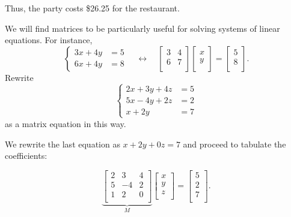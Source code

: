 \documentclass[../gatm_answers.tex]{subfiles}
\begin{document}
Thus, the party costs \$26.25 for the restaurant.

\begin{outer_problem}
\item We will find matrices to be particularly useful for solving systems of linear equations. For instance, $$\begin{cases}3x+4y&=5 \\ 6x+4y &= 8\end{cases}\quad\longleftrightarrow\quad\left[\begin{array}{cc} 3 & 4 \\ 6 & 7 \\ \end{array}\right]\left[\begin{array}{c} x \\ y \\ \end{array}\right]=\left[\begin{array}{c} 5 \\ 8 \\ \end{array}\right].$$ Rewrite $$\begin{cases}2x+3y+4z&=5 \\ 5x-4y+2z &= 2 \\ x+2y &= 7\end{cases}$$ as a matrix equation in this way.
\end{outer_problem}

We rewrite the last equation as $x+2y+0z=7$ and proceed to tabulate the coefficients:

$$\underbrace{\begin{bmatrix}
2 & 3 & 4 \\
5 & -4 & 2 \\
1 & 2 & 0 \\
\end{bmatrix}}_{M} \begin{bmatrix}
x \\
y \\
z \\
\end{bmatrix} = \begin{bmatrix}
5 \\
2 \\
7 \\
\end{bmatrix}.$$

\begin{outer_problem}
\item 
\end{outer_problem}
\end{document}
